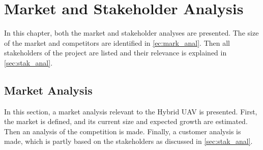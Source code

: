 \chapter{Market and Stakeholder Analysis}
\setlength{\parindent}{15pt}
\label{ch:mark_stak_anal}

In this chapter, both the market and stakeholder analyses are presented. The size of the market and competitors are identified in \autoref{ec:mark_anal}. Then all stakeholders of the project are listed and their relevance is explained in \autoref{sec:stak_anal}.

\section{Market Analysis}
\label{ec:mark_anal}

In this section, a market analysis relevant to the Hybrid UAV is presented. First, the market is defined, and its current size and expected growth are estimated. Then an analysis of the competition is made. Finally, a customer analysis is made, which is partly based on the stakeholders as discussed in \autoref{sec:stak_anal}.




